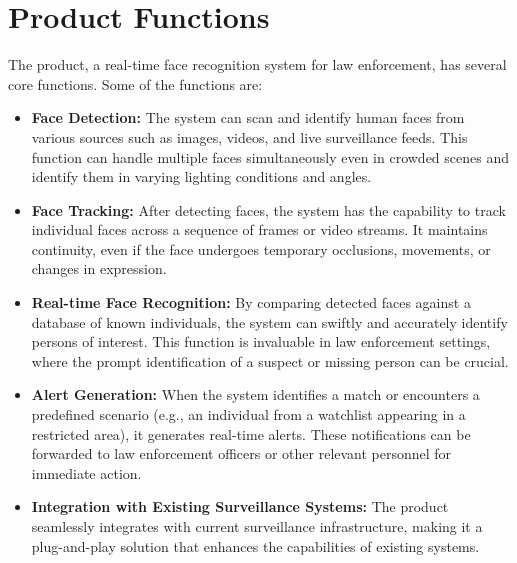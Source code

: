 \documentclass{scrreprt}
\begin{document}
    \section{Product Functions}
        The product, a real-time face recognition system for law enforcement, has several core functions. Some of the functions are:
        \begin{itemize}
            \item \textbf{Face Detection:} The system can scan and identify human faces from various sources such as images, videos, and live surveillance feeds. This function can handle multiple faces simultaneously even in crowded scenes and identify them in varying lighting conditions and angles.
            \item \textbf{Face Tracking:} After detecting faces, the system has the capability to track individual faces across a sequence of frames or video streams. It maintains continuity, even if the face undergoes temporary occlusions, movements, or changes in expression.
            \item \textbf{Real-time Face Recognition:} By comparing detected faces against a database of known individuals, the system can swiftly and accurately identify persons of interest. This function is invaluable in law enforcement settings, where the prompt identification of a suspect or missing person can be crucial.
            \item \textbf{Alert Generation:} When the system identifies a match or encounters a predefined scenario (e.g., an individual from a watchlist appearing in a restricted area), it generates real-time alerts. These notifications can be forwarded to law enforcement officers or other relevant personnel for immediate action.
            \item \textbf{Integration with Existing Surveillance Systems:} The product seamlessly integrates with current surveillance infrastructure, making it a plug-and-play solution that enhances the capabilities of existing systems.
        \end{itemize}
    
\end{document}
